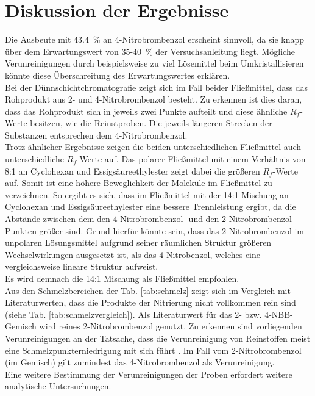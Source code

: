 \newpage
\section{Diskussion der Ergebnisse}
\label{sec:diskussion}

Die Ausbeute mit \SI{43,4}{\percent} an 4-Nitrobrombenzol erscheint sinnvoll, da sie knapp über dem Erwartungswert von 35-\SI{40}{\percent} der Versuchsanleitung liegt. Mögliche Verunreinigungen durch beispielsweise zu viel Lösemittel beim Umkristallisieren könnte diese Überschreitung des Erwartungswertes erklären.\\

Bei der Dünnschichtchromatografie zeigt sich im Fall beider Fließmittel, dass das Rohprodukt aus 2- und 4-Nitrobrombenzol besteht. Zu erkennen ist dies daran, dass das Rohprodukt sich in jeweils zwei Punkte aufteilt und diese ähnliche $R_f$-Werte besitzen, wie die Reinstproben. Die jeweils längeren Strecken der Substanzen entsprechen dem 4-Nitrobrombenzol.\\
Trotz ähnlicher Ergebnisse zeigen die beiden unterschiedlichen Fließmittel auch unterschiedliche $R_f$-Werte auf. Das polarer Fließmittel mit einem Verhältnis von 8:1 an Cyclohexan und Essigsäureethylester zeigt dabei die größeren $R_f$-Werte auf. Somit ist eine höhere Beweglichkeit der Moleküle im Fließmittel zu verzeichnen. So ergibt es sich, dass im Fließmittel mit der 14:1 Mischung an Cyclohexan und Essigsäureethylester eine bessere Trennleistung ergibt, da die Abstände zwischen dem den 4-Nitrobrombenzol- und den 2-Nitrobrombenzol-Punkten größer sind. Grund hierfür könnte sein, dass das 2-Nitrobrombenzol im unpolaren Lösungsmittel aufgrund seiner räumlichen Struktur größeren Wechselwirkungen ausgesetzt ist, als das 4-Nitrobenzol, welches eine vergleichsweise lineare Struktur aufweist.\\
Es wird demnach die 14:1 Mischung als Fließmittel empfohlen. \\

Aus den Schmelzbereichen der Tab. \ref{tab:schmelz} zeigt sich im Vergleich mit Literaturwerten, dass die Produkte der Nitrierung nicht vollkommen rein sind (siehe Tab. \ref{tab:schmelzvergleich}). Als Literaturwert für das 2- bzw. 4-NBB-Gemisch wird reines 2-Nitrobrombenzol genutzt. Zu erkennen sind vorliegenden Verunreinigungen an der Tatsache, dass die Verunreinigung von Reinstoffen meist eine Schmelzpunkterniedrigung mit sich führt \cite{ROMPPRedaktion.2002b}. Im Fall vom 2-Nitrobrombenzol (im Gemisch) gilt zumindest das 4-Nitrobrombenzol als Verunreinigung. \\
Eine weitere Bestimmung der Verunreinigungen der Proben erfordert weitere analytische Untersuchungen.

